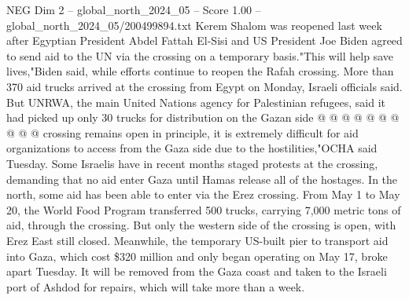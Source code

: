 \begin{textsample}{NEG Dim 2 – global\_north\_2024\_05 – Score 1.00 – global\_north\_2024\_05/200499894.txt}
Kerem Shalom was reopened last week after Egyptian President Abdel Fattah El-Sisi and US President Joe Biden agreed to send aid to the UN via the crossing on a temporary basis."This will help save lives,"Biden said, while efforts continue to reopen the Rafah crossing.
More than 370 aid trucks arrived at the crossing from Egypt on Monday, Israeli officials said.
But UNRWA, the main United Nations agency for Palestinian refugees, said it had picked up only 30 trucks for distribution on the Gazan side @ @ @ @ @ @ @ @ @ @ crossing remains open in principle, it is extremely difficult for aid organizations to access from the Gaza side due to the hostilities,"OCHA said Tuesday.
Some Israelis have in recent months staged protests at the crossing, demanding that no aid enter Gaza until Hamas release all of the hostages.
In the north, some aid has been able to enter via the Erez crossing.
From May 1 to May 20, the World Food Program transferred 500 trucks, carrying 7,000 metric tons of aid, through the crossing.
But only the western side of the crossing is open, with Erez East still closed.
Meanwhile, the temporary US-built pier to transport aid into Gaza, which cost \$320 million and only began operating on May 17, broke apart Tuesday.
It will be removed from the Gaza coast and taken to the Israeli port of Ashdod for repairs, which will take more than a week.

\end{textsample}
